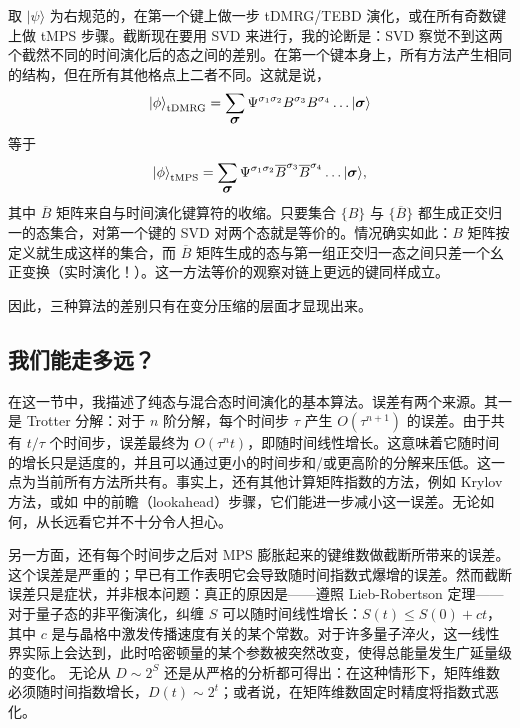 \documentclass[a4paper,10pt,oneside,onecolumn,1p,times]{elsarticle}
\newcommand{\ket}[1]{\mbox{$| #1  \rangle$}}
\newcommand{\fat}[1]{\mbox{\boldmath$#1$\unboldmath}}	%
\begin{document}
取 $\ket{\psi}$ 为右规范的，在第一个键上做一步 tDMRG/TEBD 演化，或在所有奇数键上做 tMPS 步骤。截断现在要用 SVD 来进行，我的论断是：SVD 察觉不到这两个截然不同的时间演化后的态之间的差别。在第一个键本身上，所有方法产生相同的结构，但在所有其他格点上二者不同。这就是说，
\begin{equation}
\ket{\phi}_{{\rm tDMRG}} = \sum_{\fat{\sigma}} \Psi^{\sigma_1\sigma_2} B^{\sigma_3} B^{\sigma_4} \ldots \ket{\fat{\sigma}}  
\end{equation}
等于 
\begin{equation}
\ket{\phi}_{{\rm tMPS}} = \sum_{\fat{\sigma}} \Psi^{\sigma_1\sigma_2} \overline{B}^{\sigma_3} \overline{B}^{\sigma_4} \ldots \ket{\fat{\sigma}}  ,
\end{equation}
其中 $\overline{B}$ 矩阵来自与时间演化键算符的收缩。只要集合 $\{ B \}$ 与 $\{ \overline{B} \}$ 都生成正交归一的态集合，对第一个键的 SVD 对两个态就是等价的。情况确实如此：$B$ 矩阵按定义就生成这样的集合，而 $\overline{B}$ 矩阵生成的态与第一组正交归一态之间只差一个幺正变换（实时演化！）。这一方法等价的观察对链上更远的键同样成立。

因此，三种算法的差别只有在变分压缩的层面才显现出来。
 
\subsection{我们能走多远？} 
在这一节中，我描述了纯态与混合态时间演化的基本算法。误差有两个来源。其一是 Trotter 分解：对于 $n$ 阶分解，每个时间步 $\tau$ 产生 $O(\tau^{n+1})$ 的误差。由于共有 $t/\tau$ 个时间步，误差最终为 $O(\tau^n t)$，即随时间线性增长。这意味着它随时间的增长只是适度的，并且可以通过更小的时间步和/或更高阶的分解来压低。这一点为当前所有方法所共有\cite{Vidal03a,Vidal04b,Daley04,WhiteFeiguin04,VerstraeteRipoll04}。事实上，还有其他计算矩阵指数的方法，例如 Krylov 方法\cite{Schmitteckert04}，或如 \cite{Feiguin05} 中的前瞻（lookahead）步骤，它们能进一步减小这一误差。无论如何，从长远看它并不十分令人担心。 

另一方面，还有每个时间步之后对 MPS 膨胀起来的键维数做截断所带来的误差。这个误差是严重的；早已有工作表明它会导致随时间指数式爆增的误差\cite{Gobert05}。然而截断误差只是症状，并非根本问题：真正的原因是——遵照 Lieb-Robertson 定理——对于量子态的非平衡演化，纠缠 $S$ 可以随时间线性增长：$S(t) \leq S(0) + c t$，其中 $c$ 是与晶格中激发传播速度有关的某个常数\cite{Calabrese06}。对于许多量子淬火，这一线性界实际上会达到，此时哈密顿量的某个参数被突然改变，使得总能量发生广延量级的变化。
无论从 $D \sim 2^S$ 还是从严格的分析\cite{Osborne06}都可得出：在这种情形下，矩阵维数必须随时间指数增长，$D(t) \sim 2^t$；或者说，在矩阵维数固定时精度将指数式恶化。 
\end{document}
